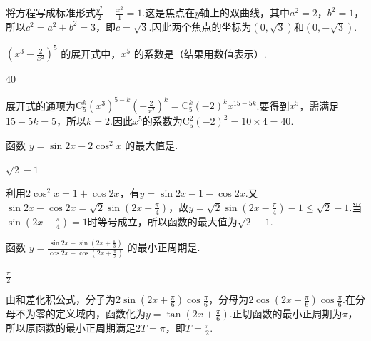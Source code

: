 \begin{solution}
将方程写成标准形式\(\frac{y^2}{2}-\frac{x^2}{1}=1\).这是焦点在\(y\)轴上的双曲线，其中\(a^2=2\)，\(b^2=1\)，所以\(c^2=a^2+b^2=3\)，即\(c=\sqrt{3}\).因此两个焦点的坐标为\((0,\sqrt{3})\)和\((0,-\sqrt{3})\).
\end{solution}

\begin{problem}
\(\left(x^{3} - \frac{2}{x^{2}}\right)^{5}\) 的展开式中，\(x^{5}\) 的系数是（结果用数值表示）\fillinblank{}.
\end{problem}

\begin{answer}
\(40\)
\end{answer}

\begin{solution}
展开式的通项为\(\mathrm C_5^k(x^3)^{5-k}\left(-\frac{2}{x^2}\right)^k=\mathrm C_5^k(-2)^k x^{15-5k}\).要得到\(x^5\)，需满足\(15-5k=5\)，所以\(k=2\).因此\(x^5\)的系数为\(\mathrm C_5^2(-2)^2=10\times4=40\).
\end{solution}

\begin{problem}
函数 \(y = \sin 2x - 2\cos^2 x \) 的最大值是\fillinblank{}.
\end{problem}

\begin{answer}
\(\sqrt{2} - 1\)
\end{answer}

\begin{solution}
利用\(2\cos^2x=1+\cos2x\)，有\(y=\sin2x-1-\cos2x\).又\(\sin2x-\cos2x=\sqrt{2}\sin\left(2x-\frac{\pi}{4}\right)\)，故\(y=\sqrt{2}\sin\left(2x-\frac{\pi}{4}\right)-1\leqslant\sqrt{2}-1\).当\(\sin\left(2x-\frac{\pi}{4}\right)=1\)时等号成立，所以函数的最大值为\(\sqrt{2}-1\).
\end{solution}

\begin{problem}
函数 \(y = \frac{\sin 2x + \sin\left(2x + \frac{\pi}{3}\right)}{\cos 2x + \cos\left(2x + \frac{\pi}{3}\right)} \) 的最小正周期是\fillinblank{}.
\end{problem}

\begin{answer}
\(\frac{\pi}{2}\)
\end{answer}

\begin{solution}
由和差化积公式，分子为\(2\sin\left(2x+\frac{\pi}{6}\right)\cos\frac{\pi}{6}\)，分母为\(2\cos\left(2x+\frac{\pi}{6}\right)\cos\frac{\pi}{6}\).在分母不为零的定义域内，函数化为\(y=\tan\left(2x+\frac{\pi}{6}\right)\).正切函数的最小正周期为\(\pi\)，所以原函数的最小正周期满足\(2T=\pi\)，即\(T=\frac{\pi}{2}\).
\end{solution}

